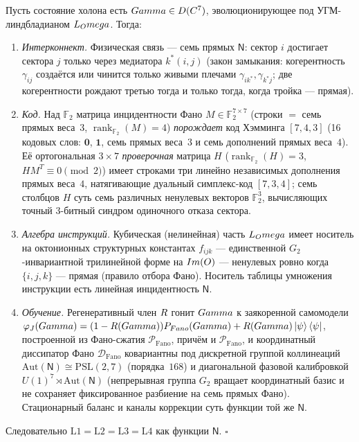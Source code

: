 \begin{theorem}\label{thm:collapse}
Пусть состояние холона есть $Gamma\in D(C^7)$, эволюционирующее под
УГМ-линдбладианом $L_Omega$. Тогда:
\begin{enumerate}[leftmargin=1.7em,itemsep=1pt]
  \item[\textbf{(L1)}] \emph{Интерконнект.} Физическая связь --- семь прямых
        $\mathsf{N}$: сектор $i$ достигает сектора $j$ только через медиатора
        $k^\ast(i,j)$ (закон замыкания: когерентность $\gamma_{ij}$ создаётся или
        чинится только живыми плечами $\gamma_{i k^\ast},\gamma_{k^\ast j}$; две
        когерентности рождают третью тогда и только тогда, когда тройка --- прямая).
  \item[\textbf{(L2)}] \emph{Код.} Над $\mathbb{F}_2$ матрица инцидентности Фано
        $M\in\mathbb{F}_2^{7\times 7}$ (строки $=$ семь прямых веса~$3$,
        $\operatorname{rank}_{\mathbb{F}_2}(M)=4$) \emph{порождает} код
        Хэмминга $[7,4,3]$ (16 кодовых слов: $\mathbf{0}$, $\mathbf{1}$, семь
        прямых веса~$3$ и семь дополнений прямых веса~$4$). Её ортогональная
        $3\times 7$ \emph{проверочная} матрица $H$
        ($\operatorname{rank}_{\mathbb{F}_2}(H)=3$, $HM^T\equiv 0\pmod 2$)
        имеет строками три линейно независимых дополнения прямых веса~$4$,
        натягивающие дуальный симплекс-код $[7,3,4]$; семь столбцов $H$ суть
        семь различных ненулевых векторов $\mathbb{F}_2^3$, вычисляющих точный
        $3$-битный синдром одиночного отказа сектора.
  \item[\textbf{(L3)}] \emph{Алгебра инструкций.} Кубическая (нелинейная) часть
        $L_Omega$ имеет носитель на октонионных структурных константах $f_{ijk}$
        --- единственной $G_2$-инвариантной трилинейной форме на $Im(O)$
        --- ненулевых ровно когда $\{i,j,k\}$ --- прямая (правило отбора Фано).
        Носитель таблицы умножения инструкции есть линейная инцидентность $\mathsf{N}$.
  \item[\textbf{(L4)}] \emph{Обучение.} Регенеративный член $R$ гонит $Gamma$
        к заякоренной самомодели
        $\varphi_J(Gamma)=(1-R(Gamma))P_{Fano}(Gamma) +
        R(Gamma)\ket{\psi}\bra{\psi}$, построенной из Фано-сжатия
        $\mathcal{P}_{\mathrm{Fano}}$, причём и $\mathcal{P}_{\mathrm{Fano}}$,
        и координатный диссипатор Фано $\mathcal{D}_{\mathrm{Fano}}$ ковариантны
        под дискретной группой коллинеаций
        $\mathrm{Aut}(\mathsf{N})\cong \mathrm{PSL}(2,7)$ (порядка~$168$) и
        диагональной фазовой калибровкой $U(1)^7\rtimes \mathrm{Aut}(\mathsf{N})$
        (непрерывная группа $G_2$ вращает координатный базис и не сохраняет
        фиксированное разбиение на семь прямых Фано). Стационарный баланс и
        каналы коррекции суть функции той же $\mathsf{N}$.
\end{enumerate}
Следовательно $\mathrm{L1}=\mathrm{L2}=\mathrm{L3}=\mathrm{L4}$ как функции
$\mathsf{N}$. \hfill$\square$
\end{theorem}

